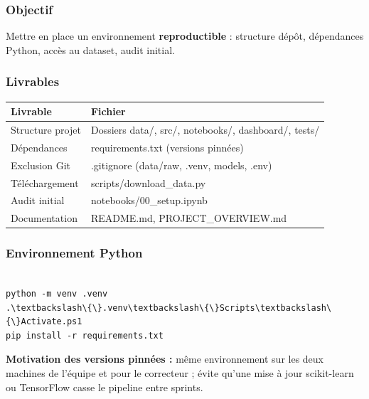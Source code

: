 \documentclass[11pt,a4paper]{report}
\begin{document}
\subsubsection{Objectif}



Mettre en place un environnement \textbf{reproductible} : structure dépôt, dépendances Python, accès au dataset, audit initial.



\subsubsection{Livrables}



\begin{longtable}{@{}ll@{}}
\toprule
Livrable & Fichier \\
\midrule
Structure projet & Dossiers data/, src/, notebooks/, dashboard/, tests/ \\
Dépendances & requirements.txt (versions pinnées) \\
Exclusion Git & .gitignore (data/raw, .venv, models, .env) \\
Téléchargement & scripts/download\_data.py \\
Audit initial & notebooks/00\_setup.ipynb \\
Documentation & README.md, PROJECT\_OVERVIEW.md \\
\bottomrule
\end{longtable}




\subsubsection{Environnement Python}



\begin{lstlisting}

python -m venv .venv
.\textbackslash\{\}.venv\textbackslash\{\}Scripts\textbackslash\{\}Activate.ps1
pip install -r requirements.txt

\end{lstlisting}



\textbf{Motivation des versions pinnées :} même environnement sur les deux machines de l'équipe et pour le correcteur ; évite qu'une mise à jour scikit-learn ou TensorFlow casse le pipeline entre sprints.
\end{document}
